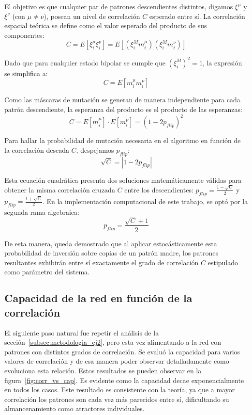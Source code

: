 El objetivo es que cualquier par de patrones descendientes distintos, digamos $\xi^\mu$ y $\xi^\nu$ (con $\mu \neq \nu$), posean un nivel de correlación $C$ esperado entre sí. La correlación espacial teórica se define como el valor esperado del producto de sus componentes:
\begin{equation}
	C = E[\xi_i^\mu \xi_i^\nu] = E[(\xi_i^M m_i^\mu) (\xi_i^M m_i^\nu)]
\end{equation}

Dado que para cualquier estado bipolar se cumple que $(\xi_i^M)^2 = 1$, la expresión se simplifica a:
\begin{equation}
	C = E[m_i^\mu m_i^\nu]
\end{equation}

Como las máscaras de mutación se generan de manera independiente para cada patrón descendiente, la esperanza del producto es el producto de las esperanzas:
\begin{equation}
	C = E[m_i^\mu] \cdot E[m_i^\nu] = (1 - 2p_{flip})^2
\end{equation}

Para hallar la probabilidad de mutación necesaria en el algoritmo en función de la correlación deseada $C$, despejamos $p_{flip}$:
\begin{equation}
	\sqrt{C} = |1 - 2p_{flip}|
\end{equation}

Esta ecuación cuadrática presenta dos soluciones matemáticamente válidas para obtener la misma correlación cruzada $C$ entre los descendientes: $p_{flip} = \frac{1 - \sqrt{C}}{2}$ y $p_{flip} = \frac{1 + \sqrt{C}}{2}$. En la implementación computacional de este trabajo, se optó por la segunda rama algebraica:
\begin{equation}
	p_{flip} = \frac{\sqrt{C} + 1}{2}
\end{equation}

De esta manera, queda demostrado que al aplicar estocásticamente esta probabilidad de inversión sobre copias de un patrón madre, los patrones resultantes exhibirán entre sí exactamente el grado de correlación $C$ estipulado como parámetro del sistema.

\subsection{Capacidad de la red en función de la correlación}

El siguiente paso natural fue repetir el análisis de la sección~\ref{subsec:metodologia_ej2}, pero esta vez alimentando a la red con patrones con distintos grados de correlación. Se evaluó la capacidad para varios valores de correlación y de esa manera poder observar detalladamente como evoluciona esta relación. Estos resultados se pueden observar en la figura~\ref{fig:corr_vs_cap}. Es evidente como la capacidad decae exponencialmente en todos los casos. Este resultado es consistente con la teoría, ya que a mayor correlación los patrones son cada vez más parecidos entre sí, dificultando su almancenamiento como atractores individuales.


